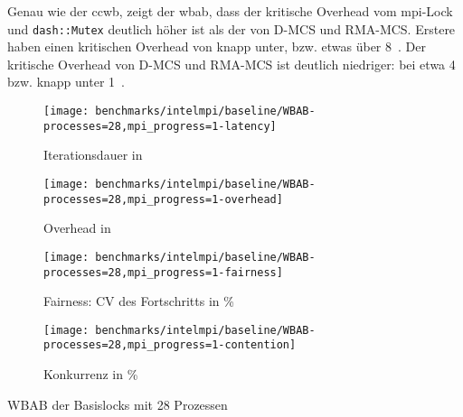 Genau wie der \gls{ccwb},
zeigt der \gls{wbab},
dass der kritische Overhead vom \gls{mpi}-Lock und \texttt{dash::Mutex} deutlich höher ist
als der von D-MCS und RMA-MCS.
Erstere haben einen kritischen Overhead von knapp unter,
bzw. etwas über 8~.
Der kritische Overhead von D-MCS und RMA-MCS ist deutlich niedriger:
bei etwa 4~ bzw. knapp unter 1~.

\begin{benchmark}[!b]
    \begin{subfigure}{.5\textwidth}
        \texttt{[image: benchmarks/intelmpi/baseline/WBAB-processes=28,mpi\_progress=1-latency]}
        \caption{Iterationsdauer in }
        \label{ben:baseline_wbab_28_latency}
    \end{subfigure}
    \begin{subfigure}{.5\textwidth}
        \texttt{[image: benchmarks/intelmpi/baseline/WBAB-processes=28,mpi\_progress=1-overhead]}
        \caption{Overhead in }
        \label{ben:baseline_wbab_28_overhead}
    \end{subfigure}
    \begin{subfigure}{.5\textwidth}
        \texttt{[image: benchmarks/intelmpi/baseline/WBAB-processes=28,mpi\_progress=1-fairness]}
        \caption{Fairness: CV des Fortschritts in \%}
        \label{ben:baseline_wbab_28_fairness}
    \end{subfigure}
    \begin{subfigure}{.5\textwidth}
        \texttt{[image: benchmarks/intelmpi/baseline/WBAB-processes=28,mpi\_progress=1-contention]}
        \caption{Konkurrenz in \%}
        \label{ben:baseline_wbab_28_contention}
    \end{subfigure}
    \caption{WBAB der Basislocks mit 28 Prozessen}
    \label{ben:baseline_wbab_28}
\end{benchmark}

